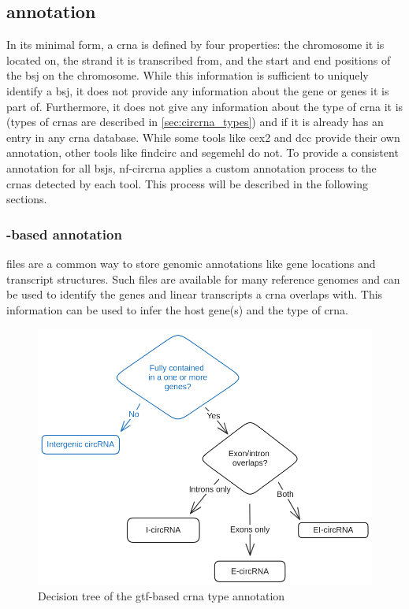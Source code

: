\subsection{ annotation}
In its minimal form, a \gls{crna} is defined by four properties: the chromosome
it is located on, the strand it is transcribed from, and the start and end
positions of the \gls{bsj} on the chromosome.
While this information is sufficient to uniquely identify a \gls{bsj}, it does
not provide any information about the gene or genes it is part of.
Furthermore, it does not give any information about the type of \gls{crna} it
is (types of \glspl{crna} are described in \cref{sec:circrna_types}) and if it
is already has an entry in any \gls{crna} database.
While some tools like \gls{cex2} and \gls{dcc} provide their own annotation,
other tools like \gls{findcirc} and \gls{segemehl} do not.
To provide a consistent annotation for all \glspl{bsj}, \gls{nf-circrna}
applies a custom annotation process to the \glspl{crna} detected by each tool.
This process will be described in the following sections.

\subsubsection{-based annotation}
\label{sec:gtf_annotation}
 files are a common way to store genomic annotations like gene
locations and transcript structures.
Such files are available for many reference genomes and can be used to identify
the genes and linear transcripts a \gls{crna} overlaps with.
This information can be used to infer the host gene(s) and the type of
\gls{crna}.

\begin{figure}[ht]
      \centering

      \includegraphics[width=\textwidth]{chapters/3_materials_and_methods/figures/annotation.png}
      \caption{Decision tree of the \gls{gtf}-based \gls{crna} type annotation}
      \label{fig:gtf_annotation}
\end{figure}

